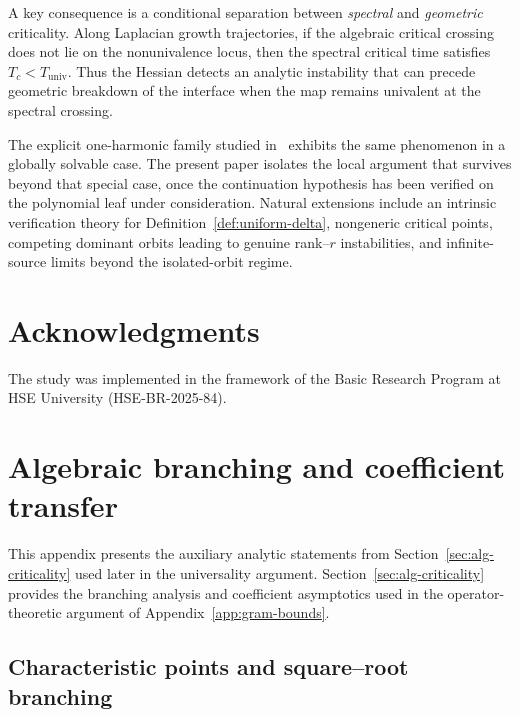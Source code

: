 \documentclass[11pt]{amsart}
\numberwithin{equation}{section}
\theoremstyle{plain}
\theoremstyle{definition}
\theoremstyle{remark}
\begin{document}
A key consequence is a conditional separation between \emph{spectral} and \emph{geometric}
criticality. Along Laplacian growth trajectories, if the algebraic critical
crossing does not lie on the nonunivalence locus, then the spectral critical
time satisfies $T_c<T_{\mathrm{univ}}$. Thus the Hessian detects an analytic
instability that can precede geometric breakdown of the interface when the map remains univalent at the spectral crossing.

The explicit one-harmonic family studied in~\cite{Alekseev2025-1} exhibits the
same phenomenon in a globally solvable case. The present paper isolates the
local argument that survives beyond that special case, once the continuation
hypothesis has been verified on the polynomial leaf under consideration.
Natural extensions include an intrinsic verification theory for
Definition~\ref{def:uniform-delta}, nongeneric critical points, competing
dominant orbits leading to genuine rank--$r$ instabilities, and
infinite-source limits beyond the isolated-orbit regime.

\section*{Acknowledgments}
The study was implemented in the framework of the Basic Research Program at HSE
University (HSE-BR-2025-84).


\appendix
\section{Algebraic branching and coefficient transfer}
\label{app:coeff-asymp}

This appendix presents the auxiliary analytic statements from
Section~\ref{sec:alg-criticality} used later in the universality argument.
Section~\ref{sec:alg-criticality} provides the branching analysis and coefficient asymptotics used in the operator-theoretic argument of Appendix~\ref{app:gram-bounds}.

\subsection{Characteristic points and square--root branching}
\label{app:xi-star-system}
\end{document}

